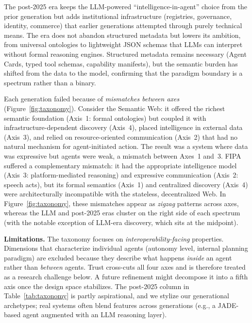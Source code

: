 \documentclass[10pt,twocolumn]{article}
\begin{document}
The post-2025 era keeps the LLM-powered ``intelligence-in-agent'' choice from the prior generation but adds institutional infrastructure (registries, governance, identity, commerce) that earlier generations attempted through purely technical means.  The era does not abandon structured metadata but lowers its ambition, from universal ontologies to lightweight JSON schemas that LLMs can interpret without formal reasoning engines.  Structured metadata remains necessary (Agent Cards, typed tool schemas, capability manifests), but the semantic burden has shifted from the data to the model, confirming that the paradigm boundary is a spectrum rather than a binary.

Each generation failed because of \emph{mismatches between axes} (Figure~\ref{fig:taxonomy}).  Consider the Semantic Web: it offered the richest semantic foundation (Axis~1: formal ontologies) but coupled it with infrastructure-dependent discovery (Axis~4), placed intelligence in external data (Axis~3), and relied on resource-oriented communication (Axis~2) that had no natural mechanism for agent-initiated action.  The result was a system where data was expressive but agents were weak, a mismatch between Axes~1 and~3.  FIPA suffered a complementary mismatch: it had the appropriate intelligence model (Axis~3: platform-mediated reasoning) and expressive communication (Axis~2: speech acts), but its formal semantics (Axis~1) and centralized discovery (Axis~4) were architecturally incompatible with the stateless, decentralized Web.  In Figure~\ref{fig:taxonomy}, these mismatches appear as \emph{zigzag} patterns across axes, whereas the LLM and post-2025 eras cluster on the right side of each spectrum (with the notable exception of LLM-era discovery, which sits at the midpoint).

\textbf{Limitations.}  The taxonomy focuses on \emph{interoperability-facing} properties. Dimensions that characterize individual agents (autonomy level, internal planning paradigm) are excluded because they describe what happens \emph{inside} an agent rather than \emph{between} agents.  Trust cross-cuts all four axes and is therefore treated as a research challenge below. A future refinement might decompose it into a fifth axis once the design space stabilizes.  The post-2025 column in Table~\ref{tab:taxonomy} is partly aspirational, and we stylize our generational archetypes; real systems often blend features across generations (e.g., a JADE-based agent augmented with an LLM reasoning layer).
\end{document}
